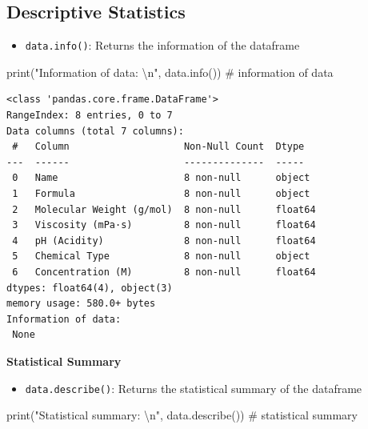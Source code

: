 \documentclass[
  letterpaper,
  DIV=11,
  numbers=noendperiod]{scrreprt}
\newenvironment{Shaded}{\begin{snugshade}}{\end{snugshade}}
\newcommand{\BuiltInTok}[1]{\textcolor[rgb]{0.00,0.23,0.31}{#1}}
\newcommand{\CharTok}[1]{\textcolor[rgb]{0.13,0.47,0.30}{#1}}
\newcommand{\CommentTok}[1]{\textcolor[rgb]{0.37,0.37,0.37}{#1}}
\newcommand{\NormalTok}[1]{\textcolor[rgb]{0.00,0.23,0.31}{#1}}
\newcommand{\StringTok}[1]{\textcolor[rgb]{0.13,0.47,0.30}{#1}}
\providecommand{\tightlist}{%
  \setlength{\itemsep}{0pt}\setlength{\parskip}{0pt}}\usepackage{longtable,booktabs,array}
\begin{document}
\subsection*{Descriptive Statistics}\label{descriptive-statistics}

\begin{itemize}
\tightlist
\item
  \texttt{data.info()}: Returns the information of the dataframe
\end{itemize}

\begin{Shaded}
\begin{Highlighting}[]
\BuiltInTok{print}\NormalTok{(}\StringTok{"Information of data: }\CharTok{\textbackslash{}n}\StringTok{"}\NormalTok{, data.info()) }\CommentTok{\# information of data}
\end{Highlighting}
\end{Shaded}

\begin{verbatim}
<class 'pandas.core.frame.DataFrame'>
RangeIndex: 8 entries, 0 to 7
Data columns (total 7 columns):
 #   Column                    Non-Null Count  Dtype  
---  ------                    --------------  -----  
 0   Name                      8 non-null      object 
 1   Formula                   8 non-null      object 
 2   Molecular Weight (g/mol)  8 non-null      float64
 3   Viscosity (mPa·s)         8 non-null      float64
 4   pH (Acidity)              8 non-null      float64
 5   Chemical Type             8 non-null      object 
 6   Concentration (M)         8 non-null      float64
dtypes: float64(4), object(3)
memory usage: 580.0+ bytes
Information of data: 
 None
\end{verbatim}

\textbf{Statistical Summary}

\begin{itemize}
\tightlist
\item
  \texttt{data.describe()}: Returns the statistical summary of the
  dataframe
\end{itemize}

\begin{Shaded}
\begin{Highlighting}[]
\BuiltInTok{print}\NormalTok{(}\StringTok{"Statistical summary: }\CharTok{\textbackslash{}n}\StringTok{"}\NormalTok{, data.describe()) }\CommentTok{\# statistical summary}
\end{Highlighting}
\end{Shaded}
\end{document}
